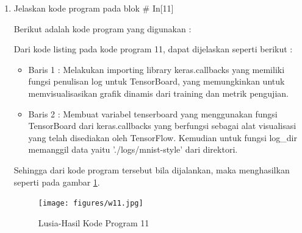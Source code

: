 \begin{enumerate}
\item Jelaskan kode program pada blok \# In[11]
	\par Berikut adalah kode program yang digunakan :
	
	\par Dari kode listing pada kode program 11, dapat dijelaskan seperti berikut :
	\begin{itemize}
	\item Baris 1	: Melakukan importing library keras.callbacks yang memiliki fungsi penulisan log untuk TensorBoard, yang memungkinkan untuk memvisualisasikan grafik dinamis dari training dan metrik pengujian.
	\item Baris 2	: Membuat variabel tenserboard yang menggunakan fungsi TensorBoard dari keras.callbacks yang berfungsi sebagai alat visualisasi yang telah disediakan oleh TensorFlow. Kemudian untuk fungsi log\_dir memanggil data yaitu './logs/mnist-style' dari direktori.
	\end{itemize}
	\par Sehingga dari kode program tersebut bila dijalankan, maka menghasilkan seperti pada gambar \ref{7B11}.
		\begin{figure}[!hbtp]
		\centering
		\texttt{[image: figures/w11.jpg]}
		\caption{Lusia-Hasil Kode Program 11}
		\label{7B11}
		\end{figure}


\end{enumerate}
